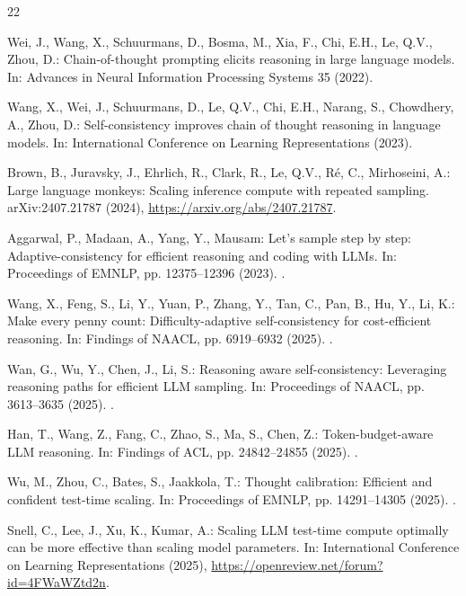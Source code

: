 \begingroup
\small
\begin{thebibliography}{22}

Wei, J., Wang, X., Schuurmans, D., Bosma, M., Xia, F., Chi, E.H., Le, Q.V.,
Zhou, D.: Chain-of-thought prompting elicits reasoning in large language
models. In: Advances in Neural Information Processing Systems 35 (2022).

Wang, X., Wei, J., Schuurmans, D., Le, Q.V., Chi, E.H., Narang, S.,
Chowdhery, A., Zhou, D.: Self-consistency improves chain of thought reasoning
in language models. In: International Conference on Learning Representations
(2023).

Brown, B., Juravsky, J., Ehrlich, R., Clark, R., Le, Q.V., R\'{e}, C.,
Mirhoseini, A.: Large language monkeys: Scaling inference compute with repeated
sampling. arXiv:2407.21787 (2024),
\url{https://arxiv.org/abs/2407.21787}.

Aggarwal, P., Madaan, A., Yang, Y., Mausam: Let's sample step by step:
Adaptive-consistency for efficient reasoning and coding with LLMs. In:
Proceedings of EMNLP, pp. 12375--12396 (2023).
.

Wang, X., Feng, S., Li, Y., Yuan, P., Zhang, Y., Tan, C., Pan, B., Hu, Y.,
Li, K.: Make every penny count: Difficulty-adaptive self-consistency for
cost-efficient reasoning. In: Findings of NAACL, pp. 6919--6932 (2025).
.

Wan, G., Wu, Y., Chen, J., Li, S.: Reasoning aware self-consistency:
Leveraging reasoning paths for efficient LLM sampling. In: Proceedings of
NAACL, pp. 3613--3635 (2025). .

Han, T., Wang, Z., Fang, C., Zhao, S., Ma, S., Chen, Z.: Token-budget-aware
LLM reasoning. In: Findings of ACL, pp. 24842--24855 (2025).
.

Wu, M., Zhou, C., Bates, S., Jaakkola, T.: Thought calibration: Efficient and
confident test-time scaling. In: Proceedings of EMNLP, pp. 14291--14305
(2025). .

Snell, C., Lee, J., Xu, K., Kumar, A.: Scaling LLM test-time compute optimally
can be more effective than scaling model parameters. In: International
Conference on Learning Representations (2025),
\url{https://openreview.net/forum?id=4FWaWZtd2n}.


\end{thebibliography}

